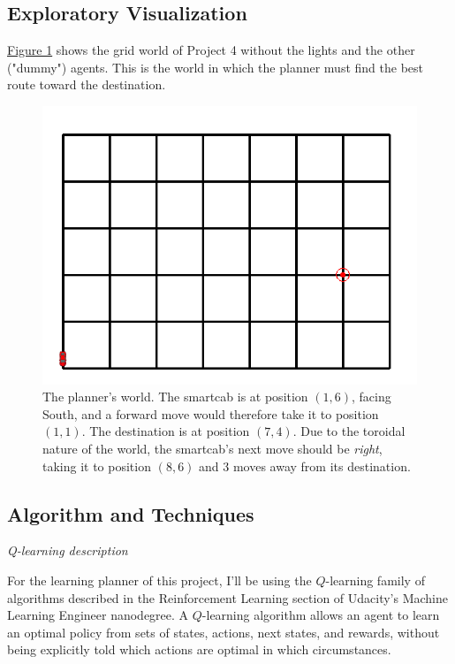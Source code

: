 \documentclass{article}
\begin{document}
\subsection{Exploratory Visualization}
\label{sec:explovis}
\hyperref[fig:world]{Figure 1} shows the grid world of Project 4 without the lights and the other ("dummy") agents. This is the world in which the planner must find the best route toward the destination.

\begin{figure}
\label{fig:world}
\includegraphics[width=\textwidth]{planner_world}
\centering
\caption{The planner's world. The smartcab is at position $(1, 6)$, facing South, and a forward move would therefore take it to position $(1, 1)$. The destination is at position $(7, 4)$. Due to the toroidal nature of the world, the smartcab's next move should be \textit{right}, taking it to position $(8, 6)$ and 3 moves away from its destination.}
\end{figure}

\subsection{Algorithm and Techniques}
\label{sec:algos}
\textit{Q-learning description}

For the learning planner of this project, I'll be using the $Q$-learning family of algorithms described in the Reinforcement Learning section of Udacity's Machine Learning Engineer nanodegree. A $Q$-learning algorithm allows an agent to learn an optimal policy from sets of states, actions, next states, and rewards, without being explicitly told which actions are optimal in which circumstances. 
\end{document}
